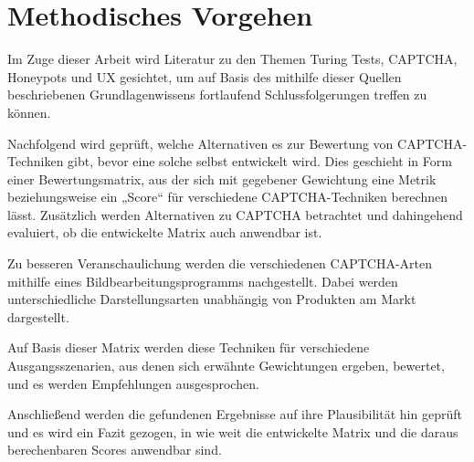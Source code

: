 \chapter{Methodisches Vorgehen}
Im Zuge dieser Arbeit wird Literatur zu den Themen Turing Tests, CAPTCHA, Honeypots und UX gesichtet, 
um auf Basis des mithilfe dieser Quellen beschriebenen Grundlagenwissens fortlaufend Schlussfolgerungen treffen zu können. 

Nachfolgend wird geprüft, welche Alternativen es zur Bewertung von CAPTCHA-Techniken gibt, bevor eine solche selbst entwickelt wird. 
Dies geschieht in Form einer Bewertungsmatrix, aus der sich mit gegebener Gewichtung eine Metrik beziehungsweise ein „Score“ für verschiedene CAPTCHA-Techniken berechnen lässt. 
Zusätzlich werden Alternativen zu CAPTCHA betrachtet und dahingehend evaluiert, ob die entwickelte Matrix auch anwendbar ist.


Zu besseren Veranschaulichung werden die verschiedenen CAPTCHA-Arten mithilfe eines Bildbearbeitungsprogramms nachgestellt. 
Dabei werden unterschiedliche Darstellungsarten unabhängig von Produkten am Markt dargestellt.

Auf Basis dieser Matrix werden diese Techniken für verschiedene Ausgangsszenarien, 
aus denen sich erwähnte Gewichtungen ergeben, bewertet, und es werden Empfehlungen ausgesprochen.

Anschließend werden die gefundenen Ergebnisse auf ihre Plausibilität hin geprüft und es wird ein Fazit gezogen, 
in wie weit die entwickelte Matrix und die daraus berechenbaren Scores anwendbar sind.
  
